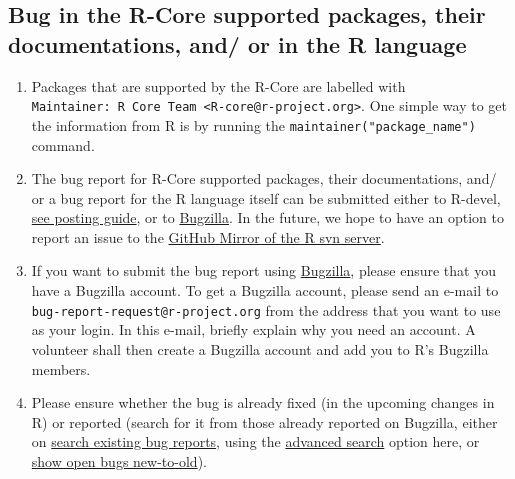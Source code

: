 \documentclass[
]{book}
\begin{document}
\hypertarget{RCorePkgBug}{%
\subsection{Bug in the R-Core supported packages, their documentations, and/ or in the R language}\label{RCorePkgBug}}

\begin{enumerate}
\def\labelenumi{\arabic{enumi}.}
\item
  Packages that are supported by the R-Core are labelled with \texttt{Maintainer:\ R\ Core\ Team\ \textless{}R-core@r-project.org\textgreater{}}. One simple way to get the information from R is by running the \texttt{maintainer("package\_name")} command.
\item
  The bug report for R-Core supported packages, their documentations, and/ or a bug report for the R language itself can be submitted either to R-devel, \href{https://www.r-project.org/posting-guide.html\#which_list}{see posting guide}, or to \href{https://bugs.r-project.org/bugzilla/}{Bugzilla}. In the future, we hope to have an option to report an issue to the \href{https://github.com/r-devel/r-svn/issues}{GitHub Mirror of the R svn server}.
\item
  If you want to submit the bug report using \protect\hyperlink{Bugzilla}{Bugzilla}, please ensure that you have a Bugzilla account. To get a Bugzilla account, please send an e-mail to \texttt{bug-report-request@r-project.org} from the address that you want to use as your login. In this e-mail, briefly explain why you need an account. A volunteer shall then create a Bugzilla account and add you to R's Bugzilla members.
\item
  Please ensure whether the bug is already fixed (in the upcoming changes in R) or reported (search for it from those already reported on Bugzilla, either on \href{https://bugs.r-project.org/bugzilla/query.cgi}{search existing bug reports}, using the \href{https://bugs.r-project.org/bugzilla/query.cgi?format=advanced}{advanced search} option here, or \href{https://bugs.r-project.org/bugzilla/buglist.cgi?bug_file_loc_type=allwordssubstr\&bug_status=NEW\&bug_status=ASSIGNED\&bug_status=CONFIRMED\&bug_status=REOPENED\&bug_status=UNCONFIRMED\&bugidtype=include\&chfieldto=Now\&cmdtype=doit\&emailassigned_to1=1\&emailassigned_to2=1\&emailcc2=1\&emailreporter2=1\&emailtype1=substring\&emailtype2=substring\&field0-0-0=noop\&long_desc_type=substring\&order=bugs.delta_ts\%20desc\&query_format=advanced\&short_desc_type=allwordssubstr\&type0-0-0=noop}{show open bugs new-to-old}).
\end{enumerate}
\end{document}
